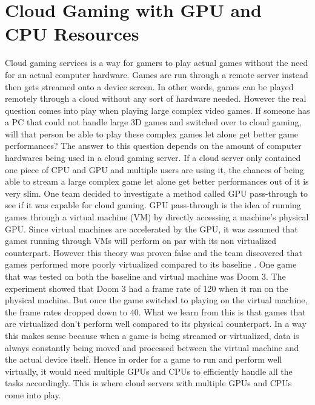 \documentclass{article}
\begin{document}
\section{Cloud Gaming with GPU and CPU Resources}
Cloud gaming services is a way for gamers to play actual games without the need for an actual computer hardware. Games are run through a remote server instead then gets streamed onto a device screen. In other words, games can be played remotely through a cloud without any sort of hardware needed. However the real question comes into play when playing large complex video games. If someone has a PC that could not handle large 3D games and switched over to cloud gaming, will that person be able to play these complex games let alone get better game performances? The answer to this question depends on the amount of computer hardwares being used in a cloud gaming server. If a cloud server only contained one piece of CPU and GPU and multiple users are using it, the chances of being able to stream a large complex game let alone get better performances out of it is very slim. One team decided to investigate a method called GPU pass-through to see if it was capable for cloud gaming. GPU pass-through is the idea of running games through a virtual machine (VM) by directly accessing a machine's physical GPU. Since virtual machines are accelerated by the GPU, it was assumed that games running through VMs will perform on par with its non virtualized counterpart. However this theory was proven false and the team discovered that games performed more poorly virtualized compared to its baseline \cite{6820614}. One game that was tested on both the baseline and virtual machine was Doom 3. The experiment showed that Doom 3 had a frame rate of 120 when it ran on the physical machine. But once the game switched to playing on the virtual machine, the frame rates dropped down to 40. What we learn from this is that games that are virtualized don’t perform well compared to its physical counterpart. In a way this makes sense because when a game is being streamed or virtualized, data is always constantly being moved and processed between the virtual machine and the actual device itself. Hence in order for a game to run and perform well virtually, it would need multiple GPUs and CPUs to efficiently handle all the tasks accordingly. This is where cloud servers with multiple GPUs and CPUs come into play. 
\end{document}
